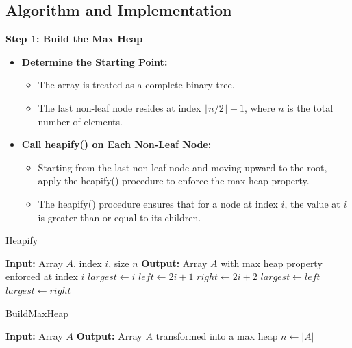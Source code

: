 \subsection{Algorithm and Implementation}

\textbf{Step 1: Build the Max Heap}
\begin{itemize}
    \item \textbf{Determine the Starting Point:}
    \begin{itemize}
        \item The array is treated as a complete binary tree.
        \item The last non-leaf node resides at index $\lfloor n/2 \rfloor - 1$, where $n$ is the total number of elements.
    \end{itemize}
    \item \textbf{Call heapify() on Each Non-Leaf Node:}
    \begin{itemize}
        \item Starting from the last non-leaf node and moving upward to the root, apply the heapify() procedure to enforce the max heap property.
        \item The heapify() procedure ensures that for a node at index $i$, the value at $i$ is greater than or equal to its children.
    \end{itemize}
\end{itemize}

\begin{algorithm}
    \caption{Heapify}
    \begin{algorithmic}[1]
        \State \textbf{Input:} Array $A$, index $i$, size $n$
        \State \textbf{Output:} Array $A$ with max heap property enforced at index $i$
        \State $largest \gets i$
        \State $left \gets 2i + 1$
        \State $right \gets 2i + 2$
        \State $largest \gets left$
        \EndIf
        \State $largest \gets right$
        \EndIf
        \State {}
        \State {}
        \EndIf
        \EndFunction
    \end{algorithmic}
\end{algorithm}

\begin{algorithm}
    \caption{BuildMaxHeap}
    \begin{algorithmic}[1]
        \State \textbf{Input:} Array $A$
        \State \textbf{Output:} Array $A$ transformed into a max heap
        \State $n \gets |A|$
        \State {}
        \EndFor
        \EndFunction
    \end{algorithmic}
\end{algorithm}

